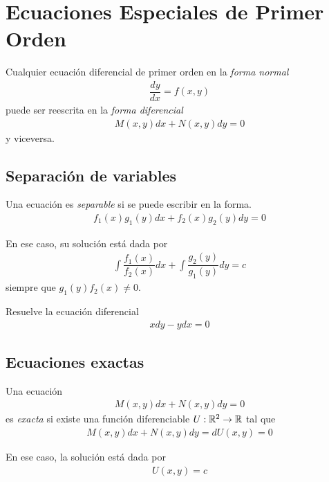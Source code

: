 \section{Ecuaciones Especiales de Primer Orden}


  Cualquier ecuación diferencial de primer orden en la \emph{forma normal}
     \begin{align}
   \dfrac{dy}{dx} = f(x,y)
   \end{align}
   puede ser reescrita en la \emph{forma diferencial}
       \begin{align}
    M(x,y)dx+N(x,y)dy =0
    \end{align}
    y  viceversa.


\subsection{Separación de variables}

Una ecuación es \emph{separable} si se puede escribir en la forma.
 \begin{align}
 f_{1}(x)g_{1}(y)dx+f_{2}(x)g_{2}(y)dy = 0
 \end{align}


{}
En ese caso, su solución  está dada por
   \begin{align}
       \displaystyle \int \dfrac{f_{1}(x)}{f_{2}(x)}dx
       + \int \dfrac{g_{2}(y)}{g_{1}(y)}dy = c
  \end{align}
  siempre que $g_{1}(y)f_{2}(x)\neq 0$.



	\begin{resuelto}
		Resuelve la ecuación diferencial
		\begin{align}
		xdy-ydx=0
		\end{align}
	\end{resuelto}

\subsection{Ecuaciones exactas}

  Una ecuación
     \begin{align}
   M(x,y)dx + N(x,y)dy = 0
   \end{align}
   es \emph{exacta} si
   existe una función diferenciable $U:\mathbb{R}^{2}\to \mathbb{R}$ tal que
       \begin{align}
       M(x,y)dx + N(x,y)dy = dU(x,y) = 0
    \end{align}


En ese caso, la solución está dada por
\begin{align}
U(x,y) = c
\end{align}


